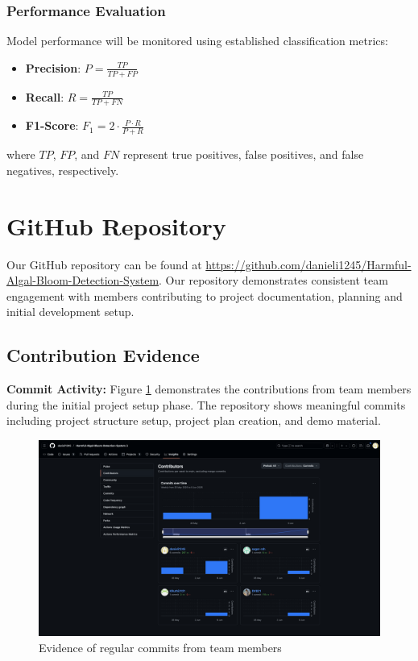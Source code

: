 \documentclass[12pt]{article}
\begin{document}
\subsubsection{Performance Evaluation}
Model performance will be monitored using established classification metrics:
\begin{itemize}
    \item \textbf{Precision}: $P = \frac{TP}{TP + FP}$
    \item \textbf{Recall}: $R = \frac{TP}{TP + FN}$
    \item \textbf{F1-Score}: $F_1 = 2 \cdot \frac{P \cdot R}{P + R}$
\end{itemize}

where $TP$, $FP$, and $FN$ represent true positives, false positives, and false negatives, respectively.



\section{GitHub Repository}
Our GitHub repository can be found at \href{https://github.com/danieli1245/Harmful-Algal-Bloom-Detection-System}{https://github.com/danieli1245/Harmful-Algal-Bloom-Detection-System}. Our repository demonstrates consistent team engagement with members contributing to project documentation, planning and initial development setup.

\subsection{Contribution Evidence}
\textbf{Commit Activity:}
Figure \ref{fig:commits} demonstrates the contributions from team members during the initial project setup phase. The repository shows meaningful commits including project structure setup, project plan creation, and demo material.

\begin{figure}[H]
\centering
\includegraphics[width=0.9\linewidth]{Commits.png}
\captionsetup{width=.8\linewidth} 
\caption[GitHub Commits]{Evidence of regular commits from team members}
\label{fig:commits}
\end{figure}
\end{document}
